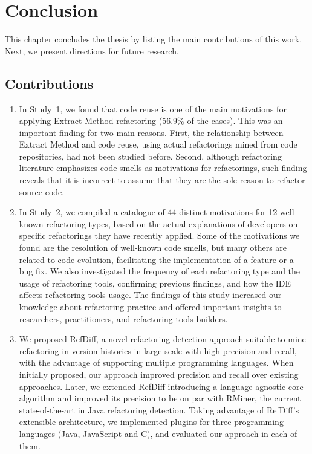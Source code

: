 
\chapter{Conclusion}
\label{ChConclusion}

This chapter concludes the thesis by listing the main contributions of this work. Next, we present directions for future research.



\section{Contributions}
\label{SecContributions}

\begin{enumerate}

\item In Study~1, we found that code reuse is one of the main motivations for applying Extract Method refactoring (56.9\% of the cases).
This was an important finding for two main reasons.
First, the relationship between Extract Method and code reuse, using actual refactorings mined from code repositories, had not been studied before.
Second, although refactoring literature emphasizes code smells as motivations for refactorings, such finding reveals that it is incorrect to assume that they are the sole reason to refactor source code.

\item In Study~2, we compiled a catalogue of 44 distinct motivations for 12 well-known refactoring types, based on the actual explanations of developers on specific refactorings they have recently applied.
Some of the motivations we found are the resolution of well-known code smells, but many others are related to code evolution, facilitating the implementation of a feature or a bug fix.
We also investigated the frequency of each refactoring type and the usage of refactoring tools, confirming previous findings, and how the IDE affects refactoring tools usage.
The findings of this study increased our knowledge about refactoring practice and offered important insights to researchers, practitioners, and refactoring tools builders.

\item We proposed RefDiff, a novel refactoring detection approach suitable to mine refactoring in version histories in large scale with high precision and recall, with the advantage of supporting multiple programming languages.
When initially proposed, our approach improved precision and recall over existing approaches.
Later, we extended RefDiff introducing a language agnostic core algorithm and improved its precision to be on par with RMiner, the current state-of-the-art in Java refactoring detection.
Taking advantage of RefDiff's extensible architecture, we implemented plugins for three programming languages (Java, JavaScript and C), and evaluated our approach in each of them.



\end{enumerate}

